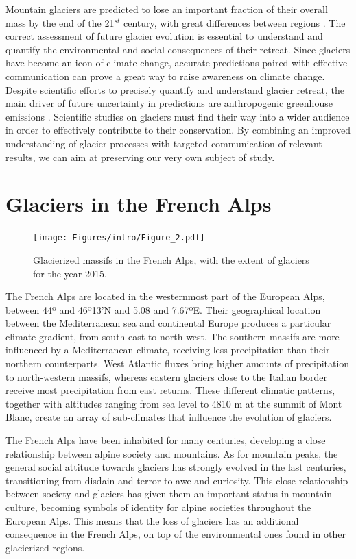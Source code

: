 Mountain glaciers are predicted to lose an important fraction of their overall mass by the end of the 21$^{st}$ century, with great differences between regions \citep{hock_glaciermip_2019}. The correct assessment of future glacier evolution is essential to understand and quantify the environmental and social consequences of their retreat. Since glaciers have become an icon of climate change, accurate predictions paired with effective communication can prove a great way to raise awareness on climate change. Despite scientific efforts to precisely quantify and understand glacier retreat, the main driver of future uncertainty in predictions are anthropogenic greenhouse emissions \citep{marzeion_partitioning_2020}. Scientific studies on glaciers must find their way into a wider audience in order to effectively contribute to their conservation. By combining an improved understanding of glacier processes with targeted communication of relevant results, we can aim at preserving our very own subject of study.  

\section{Glaciers in the French Alps}

\begin{figure}
\centering
\texttt{[image: Figures/intro/Figure\_2.pdf]}
\caption{Glacierized massifs in the French Alps, with the extent of glaciers for the year 2015.}
\label{methods:fig4}
\end{figure}

The French Alps are located in the westernmost part of the European Alps, between 44º and 46º13'N and 5.08 and 7.67ºE. Their geographical location between the Mediterranean sea and continental Europe produces a particular climate gradient, from south-east to north-west. The southern massifs are more influenced by a Mediterranean climate, receiving less precipitation than their northern counterparts. West Atlantic fluxes bring higher amounts of precipitation to north-western massifs, whereas eastern glaciers close to the Italian border receive most precipitation from east returns. These different climatic patterns, together with altitudes ranging from sea level to 4810 m at the summit of Mont Blanc, create an array of sub-climates that influence the evolution of glaciers. 

The French Alps have been inhabited for many centuries, developing a close relationship between alpine society and mountains. As for mountain peaks, the general social attitude towards glaciers has strongly evolved in the last centuries, transitioning from disdain and terror to awe and curiosity. This close relationship between society and glaciers has given them an important status in mountain culture, becoming symbols of identity for alpine societies throughout the European Alps. This means that the loss of glaciers has an additional consequence in the French Alps, on top of the environmental ones found in other glacierized regions. 

